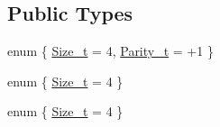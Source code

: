 \subsection*{Public Types}
\begin{DoxyCompactItemize}
\item 
enum \{ \mbox{\hyperlink{structHadron_1_1HgRep_acff328f18994ef32cfe11a8a4ae209c9a7090534cc35068f510d194147450b3f7}{Size\+\_\+t}} = 4, 
\mbox{\hyperlink{structHadron_1_1HgRep_a28a92766125066036e71f5b29771b239a6a4af3d47d749e6cf2c053f22db038be}{Parity\+\_\+t}} = +1
 \}
\item 
enum \{ \mbox{\hyperlink{structHadron_1_1HgRep_acff328f18994ef32cfe11a8a4ae209c9a7090534cc35068f510d194147450b3f7}{Size\+\_\+t}} = 4
 \}
\item 
enum \{ \mbox{\hyperlink{structHadron_1_1HgRep_acff328f18994ef32cfe11a8a4ae209c9a7090534cc35068f510d194147450b3f7}{Size\+\_\+t}} = 4
 \}
\end{DoxyCompactItemize}
